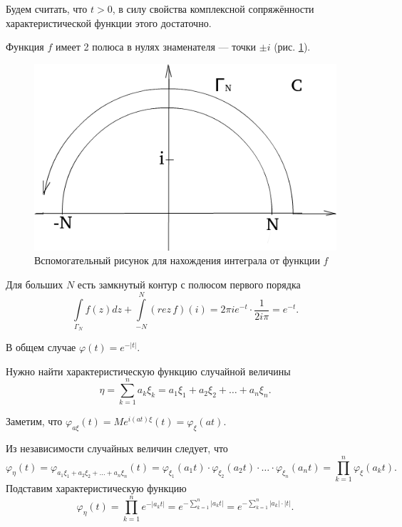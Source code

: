 Будем считать, что $t > 0$, в силу свойства комплексной сопряжённости характеристической функции этого достаточно.

Функция $f$ имеет 2 полюса в нулях знаменателя --- точки $ \pm i$ (рис. \ref{fig:1522}).

\begin{figure}[h!]
  \centering
  \includegraphics[width=.4\textwidth]{./pictures/15_22.png}
  \caption{Вспомогательный рисунок для нахождения интеграла от функции $f$}
  \label{fig:1522}
\end{figure}

Для больших $N$ есть замкнутый контур с полюсом первого порядка
$$ \int \limits_{ \Gamma_N} f \left( z \right) dz + \int \limits_{- N}^N \left( rez \, f \right) \left( i \right) =
2 \pi ie^{- t} \cdot \frac{1}{2i \pi } =
e^{- t}.$$

В общем случае $ \varphi \left( t \right) = e^{- \left| t \right| }$.

Нужно найти характеристическую функцию случайной величины
$$ \eta =
\sum \limits_{k = 1}^n a_k \xi_k =
a_1 \xi_1 + a_2 \xi_2 + \dotsc + a_n \xi_n.$$

Заметим, что $ \varphi_{a \xi } \left( t \right) = Me^{i \left( at \right) \xi } \left( t \right) = \varphi_{ \xi } \left( at \right) $.

Из независимости случайных величин следует, что
$$ \varphi_{ \eta } \left( t \right) =
\varphi_{a_1 \xi_1 + a_2 \xi_2 + \dotsc + a_n \xi_n} \left( t \right) =
\varphi_{ \xi_1} \left( a_1 t \right) \cdot \varphi_{ \xi_2} \left( a_2 t \right) \cdot \dotsc \cdot \varphi_{ \xi_n} \left( a_n t \right) =
\prod \limits_{k = 1}^n \varphi_{ \xi } \left( a_k t \right).$$
Подставим характеристическую функцию
$$ \varphi_{ \eta } \left( t \right) =
\prod \limits_{k = 1}^n e^{- \left| a_k t \right| } =
e^{- \sum \limits_{k = 1}^n \left| a_k t \right| } =
e^{- \sum \limits_{k = 1}^n \left| a_k \right| \cdot \left| t \right| }.$$

